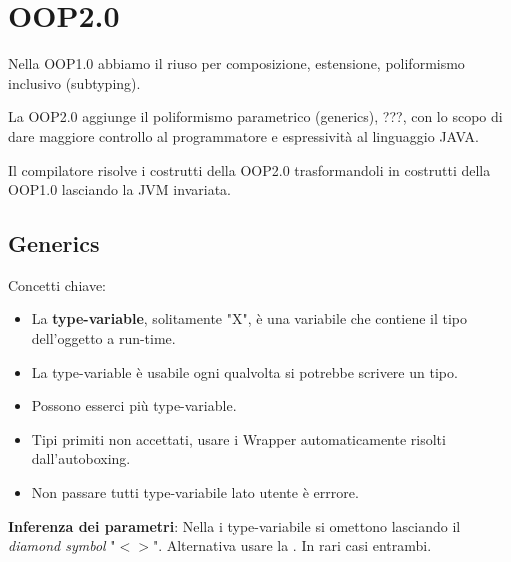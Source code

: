 \section{OOP2.0}
Nella OOP1.0 abbiamo il riuso per composizione, estensione, poliformismo inclusivo (subtyping).

La OOP2.0 aggiunge il poliformismo parametrico (generics), ???, con lo scopo di dare maggiore controllo al programmatore e espressività al linguaggio JAVA.

\begin{center}
\end{center}

Il compilatore risolve i costrutti della OOP2.0 trasformandoli in costrutti della OOP1.0 lasciando la JVM invariata.

\subsection{Generics}

Concetti chiave:
\begin{itemize}
	\item La \textbf{type-variable}, solitamente "X", è una variabile che contiene il tipo dell'oggetto a run-time.
	\item La type-variable è usabile ogni qualvolta si potrebbe scrivere un tipo.
	\item Possono esserci più type-variable.
	\item Tipi primiti non accettati, usare i Wrapper automaticamente risolti dall'autoboxing.
	\item Non passare tutti type-variabile lato utente è errrore.
\end{itemize}

\textbf{Inferenza dei parametri}: Nella  i type-variabile si omettono lasciando il \textit{diamond symbol} "$<>$". Alternativa usare la . In rari casi entrambi.

